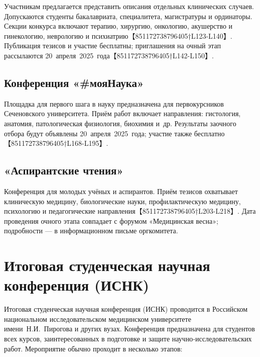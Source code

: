 \documentclass[
  russian,
  letterpaper,
]{book}
\begin{document}
Участникам предлагается представить описания отдельных клинических
случаев. Допускаются студенты бакалавриата, специалитета, магистратуры и
ординаторы. Секции конкурса включают терапию, хирургию, онкологию,
акушерство и гинекологию, неврологию и
психиатрию【851172738796405†L123-L140】. Публикация тезисов и участие
бесплатны; приглашения на очный этап рассылаются
20~апреля~2025~года【851172738796405†L142-L150】.

\subsection{Конференция
«\#мояНаука»}\label{ux43aux43eux43dux444ux435ux440ux435ux43dux446ux438ux44f-ux43cux43eux44fux43dux430ux443ux43aux430}

Площадка для первого шага в науку предназначена для первокурсников
Сеченовского университета. Приём работ включает направления: гистология,
анатомия, патологическая физиология, биохимия и~др. Результаты заочного
отбора будут объявлены 20~апреля~2025~года; участие также
бесплатно【851172738796405†L168-L195】.

\subsection{«Аспирантские
чтения»}\label{ux430ux441ux43fux438ux440ux430ux43dux442ux441ux43aux438ux435-ux447ux442ux435ux43dux438ux44f}

Конференция для молодых учёных и аспирантов. Приём тезисов охватывает
клиническую медицину, биологические науки, профилактическую медицину,
психологию и педагогические направления【851172738796405†L203-L218】.
Дата проведения очного этапа совпадает с форумом «Медицинская весна»;
подробности --- в информационном письме оргкомитета.

\section{Итоговая студенческая научная конференция
(ИСНК)}\label{ux438ux442ux43eux433ux43eux432ux430ux44f-ux441ux442ux443ux434ux435ux43dux447ux435ux441ux43aux430ux44f-ux43dux430ux443ux447ux43dux430ux44f-ux43aux43eux43dux444ux435ux440ux435ux43dux446ux438ux44f-ux438ux441ux43dux43a}

Итоговая студенческая научная конференция (ИСНК) проводится в Российском
национальном исследовательском медицинском университете
имени~Н.И.~Пирогова и других вузах. Конференция предназначена для
студентов всех курсов, заинтересованных в подготовке и защите
научно‑исследовательских работ. Мероприятие обычно проходит в несколько
этапов:
\end{document}
